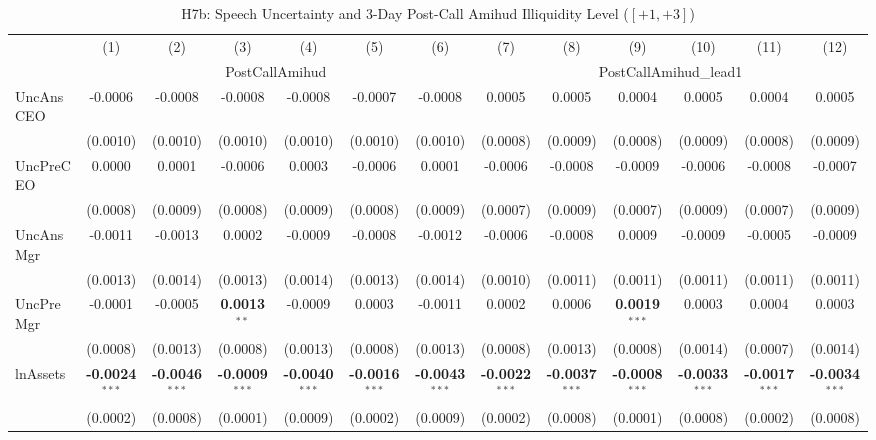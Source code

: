 \begin{landscape}
\begin{table}[H]
\setlength{\tabcolsep}{3pt}
\renewcommand{\arraystretch}{0.85}
\centering
\caption{H7b: Speech Uncertainty and 3-Day Post-Call Amihud Illiquidity Level ($[+1,+3]$)}
\label{tab:h7b}
\scriptsize
\begin{tabular}{lcccccccccccc}
\toprule
 & (1) & (2) & (3) & (4) & (5) & (6) & (7) & (8) & (9) & (10) & (11) & (12) \\
 & \multicolumn{6}{c}{PostCallAmihud} & \multicolumn{6}{c}{PostCallAmihud\_lead1} \\
\cmidrule(lr){2-7} \cmidrule(lr){8-13}
\midrule
UncAnsCEO & -0.0006 & -0.0008 & -0.0008 & -0.0008 & -0.0007 & -0.0008 & 0.0005 & 0.0005 & 0.0004 & 0.0005 & 0.0004 & 0.0005 \\
 & (0.0010) & (0.0010) & (0.0010) & (0.0010) & (0.0010) & (0.0010) & (0.0008) & (0.0009) & (0.0008) & (0.0009) & (0.0008) & (0.0009) \\
UncPreCEO & 0.0000 & 0.0001 & -0.0006 & 0.0003 & -0.0006 & 0.0001 & -0.0006 & -0.0008 & -0.0009 & -0.0006 & -0.0008 & -0.0007 \\
 & (0.0008) & (0.0009) & (0.0008) & (0.0009) & (0.0008) & (0.0009) & (0.0007) & (0.0009) & (0.0007) & (0.0009) & (0.0007) & (0.0009) \\
UncAnsMgr & -0.0011 & -0.0013 & 0.0002 & -0.0009 & -0.0008 & -0.0012 & -0.0006 & -0.0008 & 0.0009 & -0.0009 & -0.0005 & -0.0009 \\
 & (0.0013) & (0.0014) & (0.0013) & (0.0014) & (0.0013) & (0.0014) & (0.0010) & (0.0011) & (0.0011) & (0.0011) & (0.0011) & (0.0011) \\
UncPreMgr & -0.0001 & -0.0005 & \textbf{0.0013}$^{**}$ & -0.0009 & 0.0003 & -0.0011 & 0.0002 & 0.0006 & \textbf{0.0019}$^{***}$ & 0.0003 & 0.0004 & 0.0003 \\
 & (0.0008) & (0.0013) & (0.0008) & (0.0013) & (0.0008) & (0.0013) & (0.0008) & (0.0013) & (0.0008) & (0.0014) & (0.0007) & (0.0014) \\
\midrule
lnAssets & \textbf{-0.0024}$^{***}$ & \textbf{-0.0046}$^{***}$ & \textbf{-0.0009}$^{***}$ & \textbf{-0.0040}$^{***}$ & \textbf{-0.0016}$^{***}$ & \textbf{-0.0043}$^{***}$ & \textbf{-0.0022}$^{***}$ & \textbf{-0.0037}$^{***}$ & \textbf{-0.0008}$^{***}$ & \textbf{-0.0033}$^{***}$ & \textbf{-0.0017}$^{***}$ & \textbf{-0.0034}$^{***}$ \\
 & (0.0002) & (0.0008) & (0.0001) & (0.0009) & (0.0002) & (0.0009) & (0.0002) & (0.0008) & (0.0001) & (0.0008) & (0.0002) & (0.0008) \\

\end{tabular}
\end{table}
\end{landscape}
